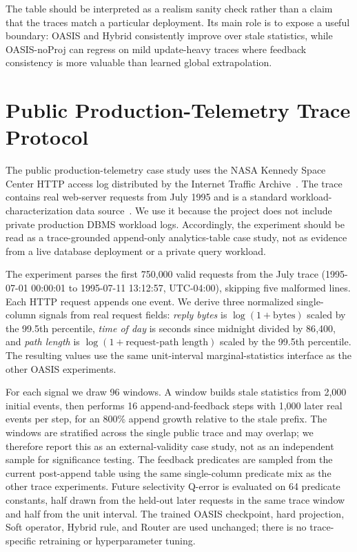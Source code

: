 \documentclass[11pt]{article}
\begin{document}


The table should be interpreted as a realism sanity check rather than a claim
that the traces match a particular deployment. Its main role is to expose a
useful boundary: OASIS and Hybrid consistently improve over stale
statistics, while OASIS-noProj can regress on mild update-heavy traces where
feedback consistency is more valuable than learned global extrapolation.

\section{Public Production-Telemetry Trace Protocol}
\label{sec:public-trace-app}

The public production-telemetry case study uses the NASA Kennedy Space Center
HTTP access log distributed by the Internet Traffic Archive~\cite{itaNASAHTTP}.
The trace contains real web-server requests from July 1995 and is a standard
workload-characterization data source~\cite{arlitt1996web}. We use it because
the project does not include private production DBMS workload logs. Accordingly,
the experiment should be read as a trace-grounded append-only analytics-table
case study, not as evidence from a live database deployment or a private query
workload.

The experiment parses the first 750{,}000 valid requests from the July trace
(1995-07-01 00:00:01 to 1995-07-11 13:12:57, UTC-04:00), skipping five malformed
lines. Each HTTP request appends one event. We derive three normalized
single-column signals from real request fields: \emph{reply bytes} is
$\log(1+\text{bytes})$ scaled by the 99.5th percentile, \emph{time of day} is
seconds since midnight divided by 86{,}400, and \emph{path length} is
$\log(1+\text{request-path length})$ scaled by the 99.5th percentile. The
resulting values use the same unit-interval marginal-statistics interface as
the other OASIS experiments.

For each signal we draw 96 windows. A window builds stale statistics from 2{,}000
initial events, then performs 16 append-and-feedback steps with 1{,}000 later
real events per step, for an 800\% append growth relative to the stale prefix.
The windows are stratified across the single public trace and may overlap; we
therefore report this as an external-validity case study, not as an independent
sample for significance testing.
The feedback predicates are sampled from the current post-append table using the
same single-column predicate mix as the other trace experiments. Future
selectivity Q-error is evaluated on 64 predicate constants, half drawn from the
held-out later requests in the same trace window and half from the unit
interval. The trained OASIS checkpoint, hard projection, Soft operator, Hybrid
rule, and Router are used unchanged; there is no
trace-specific retraining or hyperparameter tuning.
\end{document}
